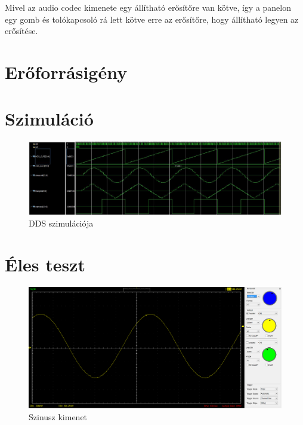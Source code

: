 \documentclass[a4paper,11pt]{article}
\begin{document}
Mivel az audio codec kimenete egy állítható erősítőre van kötve, így a panelon egy gomb és tolókapcsoló rá lett kötve erre az erősítőre, hogy állítható legyen az erősítése.

\section{Erőforrásigény}

\section{Szimuláció}



\begin{figure}[h!]
	\begin{center}
		\includegraphics[scale=0.5]{simulation.JPG}	
	\end{center}
	\caption{DDS szimulációja}
	\label{a:simulation}
\end{figure}


\section{Éles teszt}

\begin{figure}[h!]
	\begin{center}
		\includegraphics[scale=0.25]{scope_sin.png}	
	\end{center}
	\caption{Szinusz kimenet}
	\label{a:sinout}
\end{figure}
\end{document}
